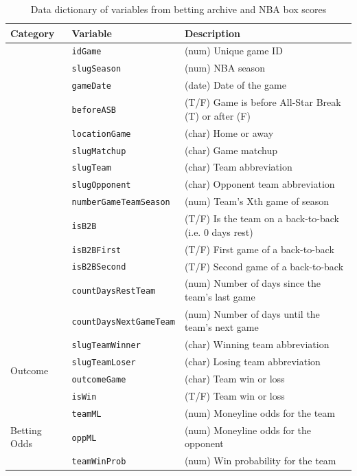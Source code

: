 \documentclass [MS] {uclathes}
\begin{document}
\footnotesize
\begin{longtable}{@{}lll@{}}
\caption{Data dictionary of variables from betting archive and NBA box scores}
\label{tab:nba-vars}\\
\toprule
Category & Variable & Description \\* \midrule
\endfirsthead
%
\endhead
%
\bottomrule
\endfoot
%
\endlastfoot
%
\multirow[t]{10}{*}{Matchup} & \texttt{idGame} & (num) Unique game ID \\
 & \texttt{slugSeason} & (num) NBA season \\
 & \texttt{gameDate} & (date) Date of the game \\
 & \texttt{beforeASB} & (T/F) Game is before All-Star Break (T) or after (F) \\
 & \texttt{locationGame} & (char) Home or away \\
 & \texttt{slugMatchup} & (char) Game matchup \\
 & \texttt{slugTeam} & (char) Team abbreviation \\
 & \texttt{slugOpponent} & (char) Opponent team abbreviation \\
 & \texttt{numberGameTeamSeason} & (num) Team's Xth game of season \\
 & \texttt{isB2B} & (T/F) Is the team on a back-to-back (i.e. 0 days rest) \\
 & \texttt{isB2BFirst} & (T/F) First game of a back-to-back \\
 & \texttt{isB2BSecond} & (T/F) Second game of a back-to-back \\
 & \texttt{countDaysRestTeam} & (num) Number of days since the team's last game \\
 & \texttt{countDaysNextGameTeam} & (num) Number of days until the team's next game \\* \midrule
\multirow[t]{4}{*}{Outcome} & \texttt{slugTeamWinner} & (char) Winning team abbreviation \\
 & \texttt{slugTeamLoser} & (char) Losing team abbreviation \\
 & \texttt{outcomeGame} & (char) Team win or loss \\
 & \texttt{isWin} & (T/F) Team win or loss \\* \midrule
\multirow[t]{4}{*}{Betting Odds} & \texttt{teamML} & (num) Moneyline odds for the team \\
 & \texttt{oppML} & (num) Moneyline odds for the opponent \\
 & \texttt{teamWinProb} & (num) Win probability for the team \\

\end{longtable}
\end{document}
